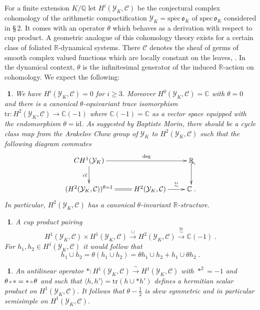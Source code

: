 \documentclass[12pt,leqno]{article}
\newcommand{\C}{{\mathbb{C}}}
\newcommand{\Q}{{\mathbb{Q}}}
\newcommand{\R}{{\mathbb{R}}}
\newcommand{\id}{\mathrm{id}}
\newcommand{\spec}{\mathrm{spec}\,}
\newcommand{\tr}{\mathrm{tr}}
\newcommand{\Ch}{{\mathcal C}}
\newcommand{\Yh}{\mathcal{Y}}
\newcommand{\eo}{\mathfrak{o}}
\newcommand{\silo}{\xrightarrow{\,\sim\,}}
\newcommand{\halb}{\frac{1}{2}}
\newtheorem{punkt}[theorem]{$\!\!$}
\newcommand{\verk}{\mbox{\scriptsize $\,\circ\,$}}
\begin{document}
For a finite extension $K / \Q$ let $H^i (\Yh_K , \Ch)$ be the conjectural complex cohomology of the arithmetic compactification $\Yh_K = \overline{\spec} \eo_K$ of $\spec \eo_K$ considered in \cite{D2} \S\,2.  It comes with an operator $\theta$ which behaves as a derivation with respect to cup product. A geometric analogue of this cohomology theory exists for a certain class of foliated $\R$-dynamical systems. There $\Ch$ denotes the sheaf of germs of smooth complex valued functions which are locally constant on the leaves, \cite{D3}. In the dynamical context, $\theta$ is the infinitesimal generator of the induced $\R$-action on cohomology. We expect the following:
\begin{punkt}\label{t2.1}\em
We have $H^i (\Yh_K , \Ch) = 0$ for $i \ge 3$. Moreover $H^0 (\Yh_K , \Ch) = \C$ with $\theta=0$ and there is a canonical $\theta$-equivariant trace isomorphism $\tr : H^2 (\Yh_K , \Ch) \to \C (-1)$ where $\C (-1) = \C$ as a vector space equipped with the endomorphism $\theta = \id$. As suggested by Baptiste Morin, there should be a cycle class map from the Arakelov Chow group of $\Yh_K$ to $H^2 (\Yh_K , \Ch)$ such that the following diagram commutes
\begin{equation} 
\label{eq:1}
\vcenter{\xymatrix{
CH^1 (\Yh_K) \ar[d]_{cl} \ar[rr]^-{\deg} & & \R \ar@{^{(}->}[d] \\
(H^2 (\Yh_K , \Ch))^{\theta = 1} \ar@{=}[r] & H^2 (\Yh_K , \Ch) \ar[r]^-{\overset{\tr}{\sim}} & \C \; .
}}
\end{equation}
In particular, $H^2 (\Yh_K , \Ch)$ has a canonical $\theta$-invariant $\R$-structure.
\end{punkt}
\begin{punkt} \label{t2.2} \em
A cup product pairing
\[
H^1 (\Yh_K , \Ch) \times H^1 (\Yh_K , \Ch) \xrightarrow{\cup} H^2 (\Yh_K , \Ch) \overset{\tr}{\silo} \C (-1) \; .
\]
For $h_1 , h_2 \in H^1 (\Yh_K , \Ch)$ it would follow that
\[
h_1 \cup h_2 = \theta (h_1 \cup h_2) = \theta h_1 \cup h_2 + h_1 \cup \theta h_2 \; .
\]
\end{punkt}
\begin{punkt} \label{t2.3} \em 
An antilinear operator $* : H^1 (\Yh_K , \Ch) \silo H^1 (\Yh_K , \Ch)$ with $*^2 = -1$ and $\theta \verk \ast = \ast \verk \theta$ and such that $\langle h , h' \rangle = \tr (h \cup *h')$ defines a hermitian scalar product on $H^1 (\Yh_K , \Ch)$. It follows that $\theta - \halb$ is skew symmetric and in particular semisimple on $H^1 (\Yh_K , \Ch)$.
\end{punkt}
\end{document}
